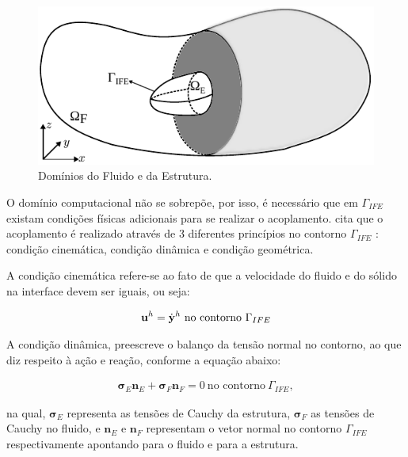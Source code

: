\documentclass[tese_patricia]{subfiles}
\begin{document}
\begin{figure}[htb!]
	\centering 
	\includegraphics[scale=1.0,trim=0cm 0cm 0cm 0.0cm, clip=true]{Imagens/Cap7/dominio.pdf}	
	\caption{Domínios do Fluido e da Estrutura.}
	\label{fig:dominios}
\end{figure}

O domínio computacional não se sobrepõe, por isso, é necessário que em $\Gamma_{IFE}$ existam condições físicas adicionais para se realizar o acoplamento.  cita que o acoplamento é realizado através de 3 diferentes princípios no contorno $\Gamma_{IFE}$ : condição cinemática, condição dinâmica e condição geométrica.

A condição cinemática refere-se ao fato de que a velocidade do fluido e do sólido na interface devem ser iguais, ou seja:

\begin{align}
\mathbf{u}^h = \dot{\mathbf{y}}^h \ \textrm{no contorno} \ \Gamma_{IFE}
\end{align}

A condição dinâmica, preescreve o balanço da tensão normal no contorno, ao que diz respeito à ação e reação, conforme a equação abaixo:

\begin{align}
\mathbf{\sigma}_{E}\mathbf{n}_{E} + \mathbf{\sigma}_{F}\mathbf{n}_{F} = 0 \ \textrm{no contorno} \ \Gamma_{IFE},
\end{align}

\noindent na qual, $\mathbf{\sigma}_{E}$ representa as tensões de Cauchy da estrutura, $\mathbf{\sigma}_{F}$ as tensões de Cauchy no fluido, e $\mathbf{n}_E$ e $\mathbf{n}_F$ representam o vetor normal no contorno $\Gamma_{IFE}$ respectivamente apontando para o fluido e para a estrutura.
\end{document}
